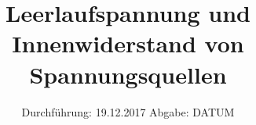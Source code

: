 

\subject{V301}
\title{Leerlaufspannung und Innenwiderstand von Spannungsquellen}
\date{%
  Durchführung: 19.12.2017
  \hspace{3em}
  Abgabe: DATUM
}



\maketitle
\thispagestyle{empty}
\tableofcontents
\newpage






\printbibliography{}


